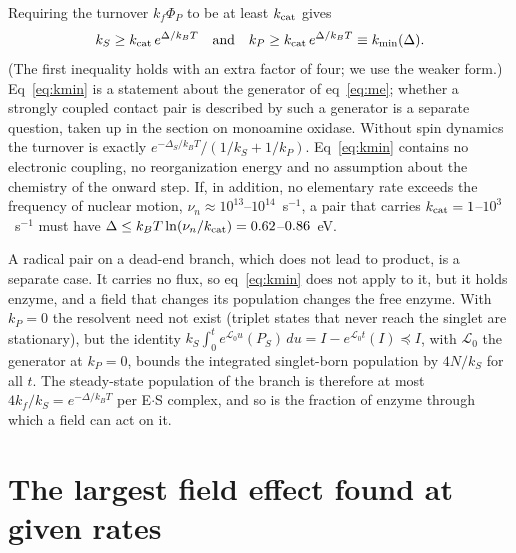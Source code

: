 \documentclass[journal=jpcbfk,manuscript=article,layout=traditional]{achemso}
\begin{document}
Requiring the turnover $k_f\Phi_P$ to be at least $k_{\rm cat}$ gives
\begin{equation}
k_S \ge k_{\rm cat}\,e^{\Delta/k_BT}\quad\text{and}\quad
k_P \ge k_{\rm cat}\,e^{\Delta/k_BT} \equiv k_{\min}(\Delta).
\label{eq:kmin}
\end{equation}
(The first inequality holds with an extra factor of four; we use the weaker
form.) Eq~\ref{eq:kmin} is a statement about the generator of
eq~\ref{eq:me}; whether a strongly coupled contact pair is described by such a
generator is a separate question, taken up in the section on monoamine oxidase. Without
spin dynamics the turnover is exactly
$e^{-\Delta_S/k_BT}/(1/k_S+1/k_P)$. Eq~\ref{eq:kmin} contains no electronic
coupling, no reorganization energy and no assumption about the chemistry of the
onward step. If, in addition, no elementary rate exceeds the frequency of
nuclear motion, $\nu_n\approx10^{13}$--$10^{14}$~s$^{-1}$, a pair that carries
$k_{\rm cat} = 1$--$10^3$~s$^{-1}$ must have
$\Delta\le k_BT\ln(\nu_n/k_{\rm cat}) = 0.62$--$0.86$~eV.

A radical pair on a dead-end branch, which does not lead to product, is a
separate case. It carries no flux, so eq~\ref{eq:kmin} does not apply to it,
but it holds enzyme, and a field that changes its population changes the free
enzyme. With $k_P=0$ the resolvent need not exist (triplet states that never
reach the singlet are stationary), but the identity
$k_S\int_0^t e^{\mathcal L_0u}(P_S)\,du = I - e^{\mathcal L_0t}(I)\preceq I$, with
$\mathcal L_0$ the generator at $k_P=0$, bounds the integrated singlet-born
population by $4N/k_S$ for all $t$. The steady-state population of the branch is
therefore at most $4k_f/k_S = e^{-\Delta/k_BT}$ per E$\cdot$S complex, and so is
the fraction of enzyme through which a field can act on it.

\section{The largest field effect found at given rates}
\label{sec:map}
\end{document}
